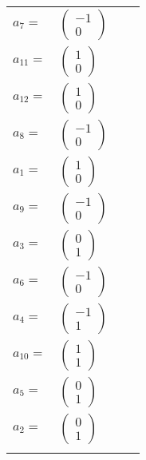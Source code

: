 \documentclass[1p]{elsarticle_modified}
\theoremstyle{definition}
\begin{document}
\begin{tabular}{m{7pt} m{180pt} m{7pt} m{180pt} }
\flushright $a_{7}=$&$\begin{pmatrix}-1\\0\end{pmatrix}$ \\
\flushright $a_{11}=$&$\begin{pmatrix}1\\0\end{pmatrix}$ \\
\flushright $a_{12}=$&$\begin{pmatrix}1\\0\end{pmatrix}$ \\
\flushright $a_{8}=$&$\begin{pmatrix}-1\\0\end{pmatrix}$ \\
\flushright $a_{1}=$&$\begin{pmatrix}1\\0\end{pmatrix}$ \\
\flushright $a_{9}=$&$\begin{pmatrix}-1\\0\end{pmatrix}$ \\
\flushright $a_{3}=$&$\begin{pmatrix}0\\1\end{pmatrix}$ \\
\flushright $a_{6}=$&$\begin{pmatrix}-1\\0\end{pmatrix}$ \\
\flushright $a_{4}=$&$\begin{pmatrix}-1\\1\end{pmatrix}$ \\
\flushright $a_{10}=$&$\begin{pmatrix}1\\1\end{pmatrix}$ \\
\flushright $a_{5}=$&$\begin{pmatrix}0\\1\end{pmatrix}$ \\
\flushright $a_{2}=$&$\begin{pmatrix}0\\1\end{pmatrix}$\\&\end{tabular}
\end{document}
